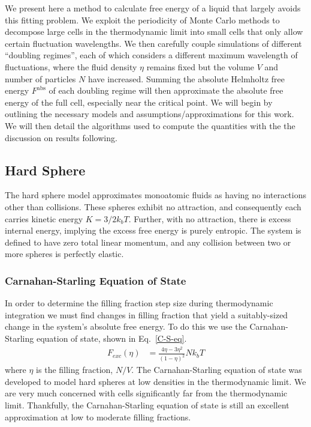 \documentclass[12pt]{article}
\begin{document}
We present here a method to calculate free energy of a liquid that largely avoids this fitting problem. We exploit the periodicity of Monte Carlo methods to decompose large cells in the thermodynamic limit into small cells that only allow certain fluctuation wavelengths. We then carefully couple simulations of different ``doubling regimes'', each of which considers a different maximum wavelength of fluctuations, where the fluid density $\eta$ remains fixed but the volume $V$ and number of particles $N$ have increased. Summing the absolute Helmholtz free energy $F^{\text{abs}}$ of each doubling regime will then approximate the absolute free energy of the full cell, especially near the critical point. We will begin by outlining the necessary models and assumptions/approximations for this work. We will then detail the algorithms used to compute the quantities with the the discussion on results following. 

\subsection{Hard Sphere}
The hard sphere model approximates monoatomic fluids as having no interactions other than collisions. These spheres exhibit no attraction, and consequently each carries kinetic energy $K = 3/2 k_b T$. Further, with no attraction, there is excess internal energy, implying the excess free energy is purely entropic. The system is defined to have zero total linear momentum, and any collision between two or more spheres is perfectly elastic. 

\subsubsection{Carnahan-Starling Equation of State}
In order to determine the filling fraction step size during thermodynamic integration we must find changes in filling fraction that yield a suitably-sized change in the system's absolute free energy. To do this we use the Carnahan-Starling equation of state, shown in Eq.~\ref{C-S-eq}.
\begin{align}
    F_{exc}(\eta) &= \frac{4\eta - 3\eta^2}{(1-\eta)^2} N k_b T  
    \label{C-S-eq}  
\end{align} 
where $\eta$ is the filling fraction, $N/V$. The Carnahan-Starling equation of state was developed to model hard spheres at low densities in the thermodynamic limit. We are very much concerned with cells significantly far from the thermodynamic limit. Thankfully, the Carnahan-Starling equation of state is still an excellent approximation at low to moderate filling fractions.\\ 
\end{document}
